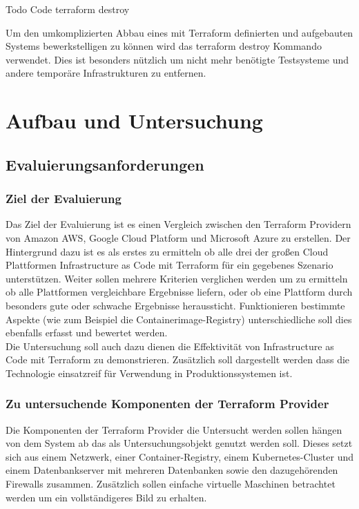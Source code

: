 Todo Code terraform destroy

Um den umkomplizierten Abbau eines mit Terraform definierten und aufgebauten
Systems bewerkstelligen zu können wird das terraform destroy Kommando
verwendet. Dies ist besonders nützlich um nicht mehr benötigte Testsysteme
und andere temporäre Infrastrukturen zu entfernen.

\chapter{Aufbau und Untersuchung}
\label{sec:real}

\section{Evaluierungsanforderungen}

\subsection{Ziel der Evaluierung}

Das Ziel der Evaluierung ist es einen Vergleich zwischen den Terraform
Providern von Amazon AWS, Google Cloud Platform und Microsoft Azure zu
erstellen. Der Hintergrund dazu ist es als erstes zu ermitteln ob alle
drei der großen Cloud Plattformen Infrastructure as Code mit Terraform
für ein gegebenes Szenario unterstützen. Weiter sollen mehrere
Kriterien verglichen werden um zu ermitteln ob alle Plattformen
vergleichbare Ergebnisse liefern, oder ob eine Plattform durch besonders
gute oder schwache Ergebnisse heraussticht. Funktionieren bestimmte
Aspekte (wie zum Beispiel die Containerimage-Registry) unterschiedliche
soll dies ebenfalls erfasst und bewertet werden.\\
Die Untersuchung soll auch dazu dienen die Effektivität von
Infrastructure as Code mit Terraform zu demonstrieren. Zusätzlich soll
dargestellt werden dass die Technologie einsatzreif für Verwendung in
Produktionssystemen ist.

\subsection{Zu untersuchende Komponenten der Terraform Provider}

Die Komponenten der Terraform Provider die Untersucht werden sollen
hängen von dem System ab das als Untersuchungsobjekt genutzt werden soll.
Dieses setzt sich aus einem Netzwerk, einer Container-Registry, einem
Kubernetes-Cluster und einem Datenbankserver mit mehreren Datenbanken
sowie den dazugehörenden Firewalls zusammen. Zusätzlich sollen
einfache virtuelle Maschinen betrachtet werden um ein vollständigeres Bild
zu erhalten.

